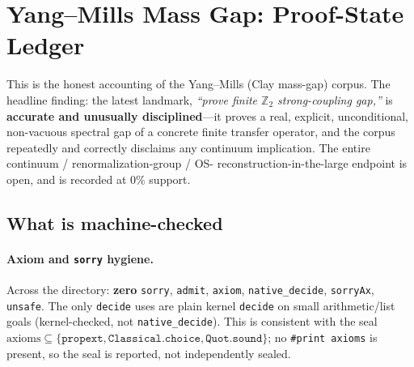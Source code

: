 %

\section{Yang--Mills Mass Gap: Proof-State Ledger}
\label{sec:ym-proofstate}

This is the honest accounting of the Yang--Mills (Clay mass-gap) corpus. The
headline finding: the latest landmark, \emph{``prove finite $\mathbb{Z}_2$
strong-coupling gap,''} is \textbf{accurate and unusually disciplined}---it
proves a real, explicit, unconditional, non-vacuous spectral gap of a concrete
finite transfer operator, and the corpus repeatedly and correctly disclaims any
continuum implication. The entire continuum / renormalization-group / OS-
reconstruction-in-the-large endpoint is open, and is recorded at $0\%$ support.

\subsection{What is machine-checked}
\label{sec:ym-checked}

\paragraph{Axiom and \texttt{sorry} hygiene.}
Across the directory: \textbf{zero} \texttt{sorry}, \texttt{admit},
\texttt{axiom}, \texttt{native\_decide}, \texttt{sorryAx}, \texttt{unsafe}. The
only \texttt{decide} uses are plain kernel \texttt{decide} on small
arithmetic/list goals (kernel-checked, not \texttt{native\_decide}). This is
consistent with the seal
$\text{axioms}\subseteq\{\texttt{propext},\texttt{Classical.choice},
\texttt{Quot.sound}\}$; no \texttt{\#print axioms} is present, so the seal is
reported, not independently sealed.

